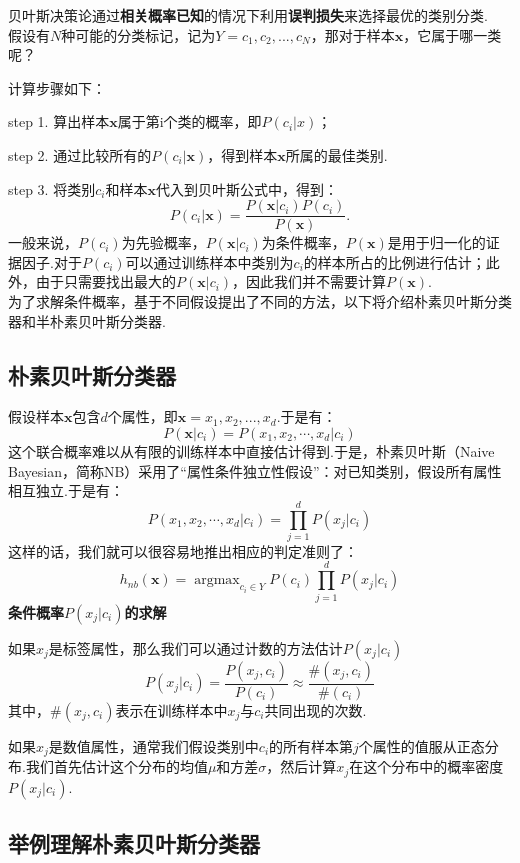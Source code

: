 ​
贝叶斯决策论通过\textbf{相关概率已知}的情况下利用\textbf{误判损失}来选择最优的类别分类.\\
假设有$N$种可能的分类标记，记为$Y={c_1,c_2,...,c_N}$，那对于样本$\boldsymbol{x}$，它属于哪一类呢？

计算步骤如下：

step 1. 算出样本$\boldsymbol{x}$属于第i个类的概率，即$P(c_i|x)​$；

step 2.
通过比较所有的$P(c_i|\boldsymbol{x})$，得到样本$\boldsymbol{x}$所属的最佳类别.

step 3. 将类别$c_i$和样本$\boldsymbol{x}$代入到贝叶斯公式中，得到：
\[
P(c_i|\boldsymbol{x})=\frac{P(\boldsymbol{x}|c_i)P(c_i)}{P(\boldsymbol{x})}.
\] ​
一般来说，$P(c_i)$为先验概率，$P(\boldsymbol{x}|c_i)$为条件概率，$P(\boldsymbol{x})$是用于归一化的证据因子.对于$P(c_i)$可以通过训练样本中类别为$c_i$的样本所占的比例进行估计；此外，由于只需要找出最大的$P(\boldsymbol{x}|c_i)$，因此我们并不需要计算$P(\boldsymbol{x})$.\\
​
为了求解条件概率，基于不同假设提出了不同的方法，以下将介绍朴素贝叶斯分类器和半朴素贝叶斯分类器.

\subsection{朴素贝叶斯分类器}\label{ux6734ux7d20ux8d1dux53f6ux65afux5206ux7c7bux5668}

​
假设样本$\boldsymbol{x}$包含$d$个属性，即$\boldsymbol{x}={ x_1,x_2,...,x_d}$.于是有：
\[
P(\boldsymbol{x}|c_i)=P(x_1,x_2,\cdots,x_d|c_i)
\]
这个联合概率难以从有限的训练样本中直接估计得到.于是，朴素贝叶斯（Naive
Bayesian，简称NB）采用了``属性条件独立性假设''：对已知类别，假设所有属性相互独立.于是有：
\[
P(x_1,x_2,\cdots,x_d|c_i)=\prod_{j=1}^d P(x_j|c_i)
\] 这样的话，我们就可以很容易地推出相应的判定准则了： \[
h_{nb}(\boldsymbol{x})=\mathop{\arg \max}_{c_i\in Y} P(c_i)\prod_{j=1}^dP(x_j|c_i)
\] \textbf{条件概率$P(x_j|c_i)​$的求解}

如果$x_j$是标签属性，那么我们可以通过计数的方法估计$P(x_j|c_i)$ \[
P(x_j|c_i)=\frac{P(x_j,c_i)}{P(c_i)}\approx\frac{\#(x_j,c_i)}{\#(c_i)}
\]
其中，$\#(x_j,c_i)$表示在训练样本中$x_j$与$c_{i}$共同出现的次数.

如果$x_j​$是数值属性，通常我们假设类别中$c_{i}​$的所有样本第$j​$个属性的值服从正态分布.我们首先估计这个分布的均值$μ​$和方差$σ​$，然后计算$x_j​$在这个分布中的概率密度$P(x_j|c_i)​$.

\subsection{举例理解朴素贝叶斯分类器}\label{ux4e3eux4f8bux7406ux89e3ux6734ux7d20ux8d1dux53f6ux65afux5206ux7c7bux5668}


